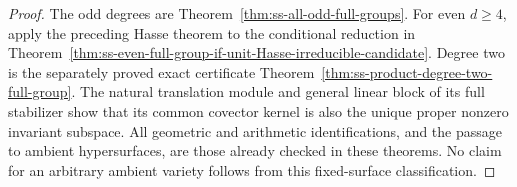 \begin{proof}
The odd degrees are Theorem~\ref{thm:ss-all-odd-full-groups}.
For even $d\ge4$, apply the preceding Hasse theorem to the
conditional reduction in
Theorem~\ref{thm:ss-even-full-group-if-unit-Hasse-irreducible-candidate}.
Degree two is the separately proved exact certificate
Theorem~\ref{thm:ss-product-degree-two-full-group}.
The natural translation module and general linear block of its
full stabilizer show that its common covector kernel is also
the unique proper nonzero invariant subspace.
All geometric and arithmetic identifications, and the passage
to ambient hypersurfaces, are those already checked in these
theorems. No claim for an arbitrary ambient variety follows
from this fixed-surface classification.
\end{proof}
